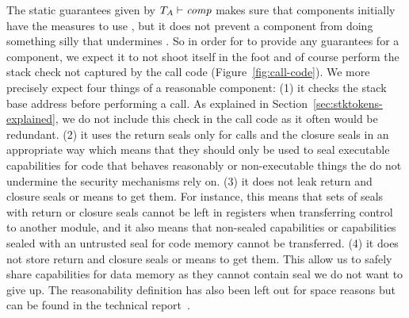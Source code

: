 \documentclass[acmsmall,review,anonymous]{acmart}\settopmatter{printfolios=true,printccs=false,printacmref=false}
\renewcommand{\comp}{\var{comp}}
\newcommand{\wdjud}[2][ ]{#1 \vdash #2}
\begin{document}
The static guarantees given by $\wdjud[\ta]{\comp}$ makes sure that components initially have the measures to use \stktokens{}, but it does not prevent a component from doing something silly that undermines \stktokens{}.
So in order for \stktokens{} to provide any guarantees for a component, we expect it to not shoot itself in the foot and of course perform the stack check not captured by the call code (Figure~\ref{fig:call-code}).
We more precisely expect four things of a reasonable component: (1) it checks the stack base address before performing a call.
As explained in Section~\ref{sec:stktokens-explained}, we do not include this check in the call code as it often would be redundant.
(2) it uses the return seals only for calls and the closure seals in an appropriate way which means that they should only be used to seal executable capabilities for code that behaves reasonably or non-executable things the do not undermine the security mechanisms \stktokens{} rely on.
(3) it does not leak return and closure seals or means to get them.
For instance, this means that sets of seals with return or closure seals cannot be left in registers when transferring control to another module, and it also means that non-sealed capabilities or capabilities sealed with an untrusted seal for code memory cannot be transferred.
(4) it does not store return and closure seals or means to get them.
This allow us to safely share capabilities for data memory as they cannot contain seal we do not want to give up.
The reasonability definition has also been left out for space reasons but can be found in the technical report~\citep{technical_report}.


\end{document}
